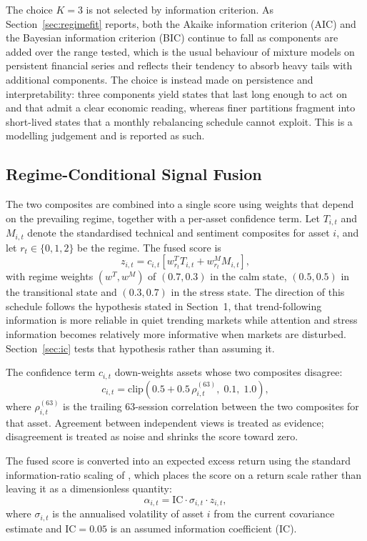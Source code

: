 The choice $K = 3$ is not selected by information criterion. As
Section~\ref{sec:regimefit} reports, both the Akaike information criterion (AIC)
and the Bayesian information criterion (BIC) continue to fall as components are added
over the range tested, which is the usual behaviour of mixture models on
persistent financial series and reflects their tendency to absorb heavy tails with
additional components. The choice is instead made on persistence and interpretability:
three components yield states that last long enough to act on and that admit a clear
economic reading, whereas finer partitions fragment into short-lived states that a
monthly rebalancing schedule cannot exploit. This is a modelling judgement and is
reported as such.

\subsection{Regime-Conditional Signal Fusion}

The two composites are combined into a single score using weights that depend on the
prevailing regime, together with a per-asset confidence term. Let $T_{i,t}$ and
$M_{i,t}$ denote the standardised technical and sentiment composites for asset $i$,
and let $r_t \in \{0,1,2\}$ be the regime. The fused score is
\begin{equation}
z_{i,t} = c_{i,t} \left[ w^{T}_{r_t} T_{i,t} + w^{M}_{r_t} M_{i,t} \right],
\end{equation}
with regime weights $(w^T, w^M)$ of $(0.7, 0.3)$ in the calm state, $(0.5, 0.5)$ in the
transitional state and $(0.3, 0.7)$ in the stress state. The direction of this schedule
follows the hypothesis stated in Section~1, that trend-following information is more
reliable in quiet trending markets while attention and stress information becomes
relatively more informative when markets are disturbed. Section~\ref{sec:ic} tests that
hypothesis rather than assuming it.

The confidence term $c_{i,t}$ down-weights assets whose two composites disagree:
\begin{equation}
c_{i,t} = \mathrm{clip}\!\left(0.5 + 0.5\,\rho^{(63)}_{i,t}, \; 0.1, \; 1.0\right),
\end{equation}
where $\rho^{(63)}_{i,t}$ is the trailing 63-session correlation between the two
composites for that asset. Agreement between independent views is treated as evidence;
disagreement is treated as noise and shrinks the score toward zero.

The fused score is converted into an expected excess return using the standard
information-ratio scaling of \citet{grinold00}, which places the score on a return
scale rather than leaving it as a dimensionless quantity:
\begin{equation}
\alpha_{i,t} = \mathrm{IC} \cdot \sigma_{i,t} \cdot z_{i,t},
\label{eq:alpha}
\end{equation}
where $\sigma_{i,t}$ is the annualised volatility of asset $i$ from the current
covariance estimate and $\mathrm{IC} = 0.05$ is an assumed information coefficient (IC).

